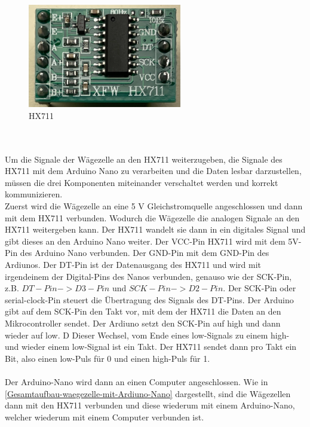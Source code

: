 \begin{figure}[h!]
    \centering
    \includegraphics[width=0.6\textwidth]{img/HX711.png}
    \caption{HX711 \cite{prilchen}}
    \label{fig:HX711}
\end{figure}
\\
\\
Um die Signale der Wägezelle an den HX711 weiterzugeben, die Signale des HX711 mit dem Arduino Nano zu verarbeiten und die Daten lesbar darzustellen, müssen die drei Komponenten miteinander verschaltet werden und korrekt kommunizieren.
\\
Zuerst wird die Wägezelle an eine 5 V Gleichstromquelle angeschlossen und dann mit dem HX711 verbunden.
 Wodurch die Wägezelle die analogen Signale an den HX711 weitergeben kann. 
 Der HX711 wandelt sie dann in ein digitales Signal und gibt dieses an den Arduino Nano weiter. 
 Der VCC-Pin HX711 wird mit dem 5V-Pin des Arduino Nano verbunden. 
 Der GND-Pin mit dem GND-Pin des Ardiunos. 
 Der DT-Pin ist der Datenausgang des HX711 und wird mit irgendeinem der Digital-Pins des Nanos verbunden, genauso wie der SCK-Pin, z.B. $DT-Pin -> D3-Pin$ und $SCK-Pin -> D2-Pin$. 
 Der SCK-Pin oder serial-clock-Pin steuert die Übertragung des Signals des DT-Pins. 
 Der Arduino gibt auf dem SCK-Pin den Takt vor, mit dem der HX711 die Daten an den Mikrocontroller sendet. 
 Der Ardiuno setzt den SCK-Pin auf high und dann wieder auf low. D
 Dieser Wechsel, vom Ende eines low-Signals zu einem high- und wieder einem low-Signal ist ein Takt. 
 Der HX711 sendet dann pro Takt ein Bit, also einen low-Puls für 0 und einen high-Puls für 1.
\\
\\
Der Arduino-Nano wird dann an einen Computer angeschlossen. Wie in \autoref{Gesamtaufbau-waegezelle-mit-Ardiuno-Nano} dargestellt, sind die Wägezellen dann mit den HX711 verbunden und diese wiederum mit einem Arduino-Nano, welcher wiederum mit einem Computer verbunden ist. 
